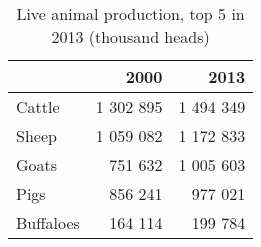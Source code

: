 \begin{table}
\centering
\caption{Live animal production, top 5 in 2013 (thousand heads)} 
{\footnotesize
\begin{tabular}{p{1.0cm}rr}
  \toprule
 & 2000 & 2013 \\ 
  \midrule
Cattle & 1 302 895 & 1 494 349 \\ 
  Sheep & 1 059 082 & 1 172 833 \\ 
  Goats &   751 632 & 1 005 603 \\ 
  Pigs &   856 241 &   977 021 \\ 
  Buffaloes &   164 114 &   199 784 \\ 
   \bottomrule
\end{tabular}
}
\end{table}
